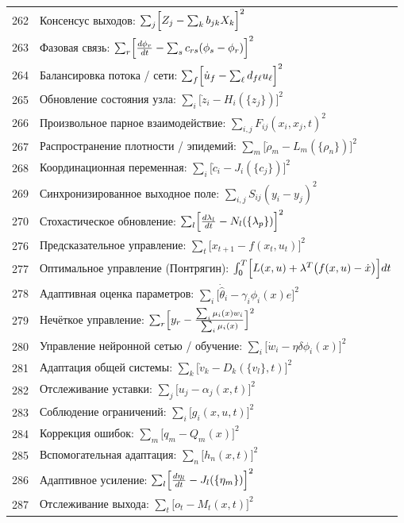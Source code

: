 \documentclass[12pt,a4paper]{article}
\begin{document}
\begin{longtable}{r l}
		262 & Консенсус выходов: $\sum_j\Bigl[Z_j - \sum_k b_{jk}X_k\Bigr]^2$ \\
		263 & Фазовая связь: $\sum_r\Bigl[\frac{d\phi_r}{dt} - \sum_s c_{rs}(\phi_s-\phi_r)\Bigr]^2$ \\
		264 & Балансировка потока / сети: $\sum_f\Bigl[\dot u_f - \sum_\ell d_{f\ell}u_\ell\Bigr]^2$ \\
		265 & Обновление состояния узла: $\sum_i\bigl[\dot z_i - H_i(\{z_j\})\bigr]^2$ \\
		266 & Произвольное парное взаимодействие: $\sum_{i,j}F_{ij}(x_i,x_j,t)^2$ \\
		267 & Распространение плотности / эпидемий: $\sum_m\bigl[\dot\rho_m - L_m(\{\rho_n\})\bigr]^2$ \\
		268 & Координационная переменная: $\sum_i\bigl[\dot c_i - J_i(\{c_j\})\bigr]^2$ \\
		269 & Синхронизированное выходное поле: $\sum_{i,j}S_{ij}(y_i-y_j)^2$ \\
		270 & Стохастическое обновление: $\sum_l\Bigl[\frac{d\lambda_l}{dt} - N_l(\{\lambda_p\})\Bigr]^2$ \\
		276 & Предсказательное управление: $\sum_t\bigl[x_{t+1} - f(x_t,u_t)\bigr]^2$ \\
		277 & Оптимальное управление (Понтрягин): $\int_0^T\Bigl[L(x,u) + \lambda^T\bigl(f(x,u)-\dot x\bigr)\Bigr]dt$ \\
		278 & Адаптивная оценка параметров: $\sum_i\bigl[\dot{\hat\theta}_i - \gamma_i\phi_i(x)e\bigr]^2$ \\
		279 & Нечёткое управление: $\sum_r\Bigl[y_r - \frac{\sum_i\mu_i(x)w_i}{\sum_i\mu_i(x)}\Bigr]^2$ \\
		280 & Управление нейронной сетью / обучение: $\sum_i\bigl[\dot w_i - \eta\delta\phi_i(x)\bigr]^2$ \\
		281 & Адаптация общей системы: $\sum_k\bigl[\dot v_k - D_k(\{v_l\},t)\bigr]^2$ \\
		282 & Отслеживание уставки: $\sum_j\bigl[u_j - \alpha_j(x,t)\bigr]^2$ \\
		283 & Соблюдение ограничений: $\sum_i\bigl[g_i(x,u,t)\bigr]^2$ \\
		284 & Коррекция ошибок: $\sum_m\bigl[q_m - Q_m(x)\bigr]^2$ \\
		285 & Вспомогательная адаптация: $\sum_n\bigl[h_n(x,t)\bigr]^2$ \\
		286 & Адаптивное усиление: $\sum_l\Bigl[\frac{d\eta_l}{dt} - J_l(\{\eta_m\})\Bigr]^2$ \\
		287 & Отслеживание выхода: $\sum_t\bigl[o_t - M_t(x,t)\bigr]^2$ \\

\end{longtable}
\end{document}

